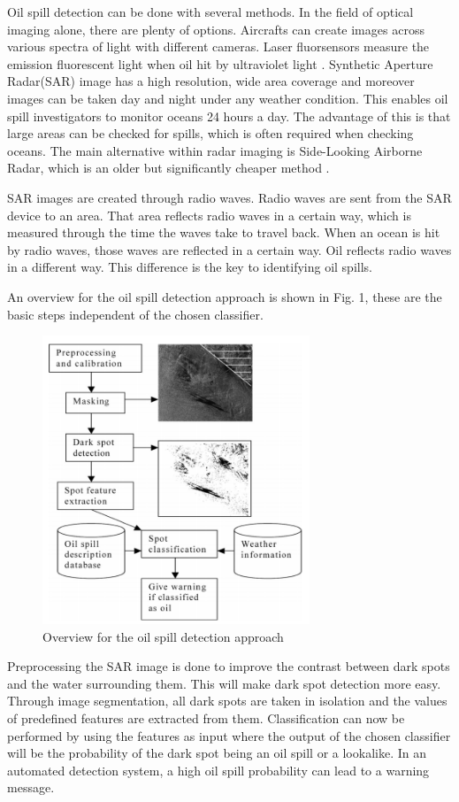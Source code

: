 \hspace{0.5cm} Oil spill detection can be done with several methods. In the field of optical imaging alone, there are plenty of options. Aircrafts can create images across various spectra of light with different cameras. Laser fluorsensors measure the emission fluorescent light when oil hit by ultraviolet light \cite{fingas2014review}. Synthetic Aperture Radar(SAR) image has a high resolution, wide area coverage and moreover images can be taken day and night under any weather condition. This enables oil spill investigators to monitor oceans 24 hours a day\cite{Chang20081915}. The advantage of this is that large areas can be checked for spills, which is often required when checking oceans. The main alternative within radar imaging is Side-Looking Airborne Radar, which is an older but significantly cheaper method \cite{fingas2014review}. 

SAR images are created through radio waves. Radio waves are sent from the SAR device to an area. That area reflects radio waves in a certain way, which is measured through the time the waves take to travel back. \cite{Doerry:04} When an ocean is hit by radio waves, those waves are reflected in a certain way. Oil reflects radio waves in a different way. This difference is the key to identifying oil spills.

An overview for the oil spill detection approach is shown in Fig. 1, these are the basic steps independent of the chosen classifier.

\begin{figure}[H]
    \includegraphics[width=80mm]{./img/detection_diagram.png}
    \caption{Overview for the oil spill detection approach \cite{Solberg200745}}
    \label{fig:overview}
\end{figure}

Preprocessing the SAR image is done to improve the contrast between dark spots and the water surrounding them. This will make dark spot detection more easy. Through image segmentation, all dark spots are taken in isolation and the values of predefined features are extracted from them. Classification can now be performed by using the features as input where the output of the chosen classifier will be the probability of the dark spot being an oil spill or a lookalike. In an automated detection system, a high oil spill probability can lead to a warning message.






